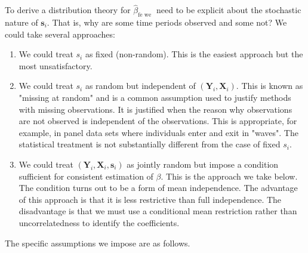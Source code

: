 \documentclass[10pt]{article}
\begin{document}
To derive a distribution theory for $\widehat{\beta}_{\text {fe we }}$ need to be explicit about the stochastic nature of $\boldsymbol{s}_{i}$. That is, why are some time periods observed and some not? We could take several approaches:

\begin{enumerate}
  \item We could treat $s_{i}$ as fixed (non-random). This is the easiest approach but the most unsatisfactory.

  \item We could treat $s_{i}$ as random but independent of $\left(\boldsymbol{Y}_{i}, \boldsymbol{X}_{i}\right)$. This is known as "missing at random" and is a common assumption used to justify methods with missing observations. It is justified when the reason why observations are not observed is independent of the observations. This is appropriate, for example, in panel data sets where individuals enter and exit in "waves". The statistical treatment is not substantially different from the case of fixed $s_{i}$.

  \item We could treat $\left(\boldsymbol{Y}_{i}, \boldsymbol{X}_{i}, \boldsymbol{s}_{i}\right)$ as jointly random but impose a condition sufficient for consistent estimation of $\beta$. This is the approach we take below. The condition turns out to be a form of mean independence. The advantage of this approach is that it is less restrictive than full independence. The disadvantage is that we must use a conditional mean restriction rather than uncorrelatedness to identify the coefficients.

\end{enumerate}
The specific assumptions we impose are as follows.
\end{document}
